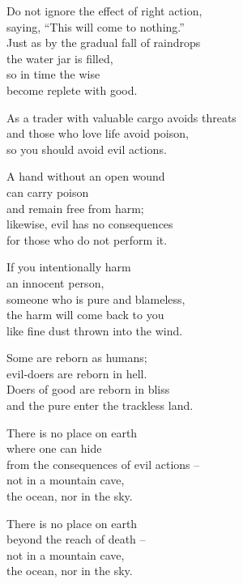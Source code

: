 Do not ignore the effect of right action,\\
saying, “This will come to nothing.”\\
Just as by the gradual fall of raindrops\\
the water jar is filled,\\
so in time the wise\\
become replete with good.


As a trader with valuable cargo avoids threats\\
and those who love life avoid poison,\\
so you should avoid evil actions.


A hand without an open wound\\
can carry poison\\
and remain free from harm;\\
likewise, evil has no consequences\\
for those who do not perform it.


If you intentionally harm\\
an innocent person,\\
someone who is pure and blameless,\\
the harm will come back to you\\
like fine dust thrown into the wind.


Some are reborn as humans;\\
evil-doers are reborn in hell.\\
Doers of good are reborn in bliss\\
and the pure enter the trackless land.


There is no place on earth\\
where one can hide\\
from the consequences of evil actions --\\
not in a mountain cave,\\
the ocean, nor in the sky.


There is no place on earth\\
beyond the reach of death --\\
not in a mountain cave,\\
the ocean, nor in the sky.

